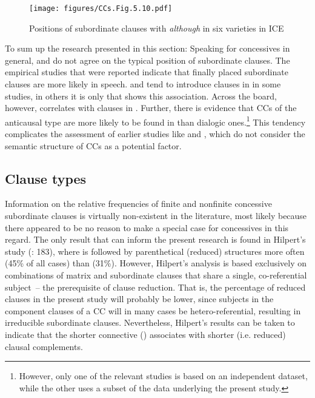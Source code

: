 \begin{figure}
\texttt{[image: figures/CCs.Fig.5.10.pdf]}
\caption{\label{bkm:Ref35890523}\label{fig:5.10}Positions of subordinate clauses with \textit{although} in six varieties in ICE \citep{Schützler2020b}}
 \end{figure}

  To sum up the research presented in this section: Speaking for concessives in general, \citet{QuirkEtAl1985} and \citet{BiberEtAl1999} do not agree on the typical position of subordinate clauses. The empirical studies that were reported indicate that finally placed subordinate clauses are more likely in speech.  and  tend to introduce clauses in  in some studies, in others it is only  that shows this association. Across the board, however,  correlates with clauses in . Further, there is evidence that CCs of the anticausal type are more likely to be found in  than dialogic ones.\footnote{However, only one of the relevant studies is based on an independent dataset, while the other uses a subset of the data underlying the present study.} This tendency complicates the assessment of earlier studies like \citet{Altenberg1986} and \citet{Aarts1988}, which do not consider the semantic structure of CCs as a potential factor.

\subsection{\label{bkm:Ref35854988}Clause types}\label{sec:5.1.4}

Information on the relative frequencies of finite and nonfinite concessive subordinate clauses is virtually non-existent in the literature, most likely because there appeared to be no reason to make a special case for concessives in this regard. The only result that can inform the present research is found in Hilpert’s study (\citeyear{Hilpert2013a}: 183), where  is followed by parenthetical (reduced) structures more often (45\% of all cases) than  (31\%). However, Hilpert’s analysis is based exclusively on combinations of matrix and subordinate clauses that share a single, co-referential subject~– the prerequisite of clause reduction. That is, the percentage of reduced clauses in the present study will probably be lower, since subjects in the component clauses of a CC will in many cases be hetero-referential, resulting in irreducible subordinate clauses. Nevertheless, Hilpert’s results can be taken to indicate that the shorter connective () associates with shorter (i.e. reduced) clausal complements.

